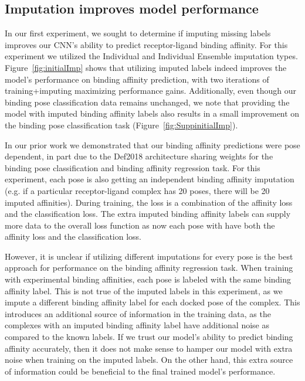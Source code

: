 \documentclass[journal=jcim,manuscript=article]{achemso}
\begin{document}
\subsection{Imputation improves model performance}
In our first experiment, we sought to determine if imputing missing labels improves our CNN's ability to predict receptor-ligand binding affinity.
For this experiment we utilized the Individual and Individual Ensemble imputation types.
Figure~\ref{fig:initialImp} shows that utilizing imputed labels indeed improves the model's performance on binding affinity prediction, with two iterations of training+imputing maximizing performance gains.
Additionally, even though our binding pose classification data remains unchanged, we note that providing the model with imputed binding affinity labels also results in a small improvement on the binding pose classification task (Figure~\ref{fig:SuppinitialImp}).

In our prior work we demonstrated that our binding affinity predictions were pose dependent, in part due to the Def2018 architecture sharing weights for the binding pose classification and binding affinity regression task\cite{crossdocked2020}.
For this experiment, each pose is also getting an independent binding affinity imputation (e.g. if a particular receptor-ligand complex has 20 poses, there will be 20 imputed affinities).
During training, the loss is a combination of the affinity loss and the classification loss.
The extra imputed binding affinity labels can supply more data to the overall loss function as now each pose with have both the affinity loss and the classification loss.

However, it is unclear if utilizing different imputations for every pose is the best approach for performance on the binding affinity regression task.
When training with experimental binding affinities, each pose is labeled with the same binding affinity label.
This is not true of the imputed labels in this experiment, as we impute a different binding affinity label for each docked pose of the complex.
This introduces an additional source of information in the training data, as the complexes with an imputed binding affinity label have additional noise as compared to the known labels.
If we trust our model's ability to predict binding affinity accurately, then it does not make sense to hamper our model with extra noise when training on the imputed labels.
On the other hand, this extra source of information could be beneficial to the final trained model's performance.
\end{document}

